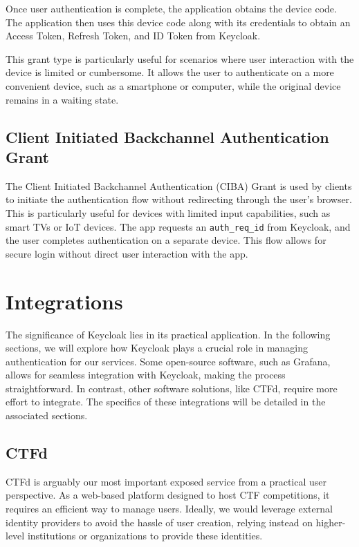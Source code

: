 Once user authentication is complete, the application obtains the device code. The application then uses this device code along with its credentials to obtain an Access Token, Refresh Token, and ID Token from Keycloak.

This grant type is particularly useful for scenarios where user interaction with the device is limited or cumbersome. It allows the user to authenticate on a more convenient device, such as a smartphone or computer, while the original device remains in a waiting state.

\subsection*{Client Initiated Backchannel Authentication Grant}
The Client Initiated Backchannel Authentication (CIBA) Grant is used by clients to initiate the authentication flow without redirecting through the user's browser. This is particularly useful for devices with limited input capabilities, such as smart TVs or IoT devices. The app requests an \texttt{auth\_req\_id} from Keycloak, and the user completes authentication on a separate device. This flow allows for secure login without direct user interaction with the app.

\newpage

\section{Integrations}
The significance of Keycloak lies in its practical application. In the following sections, we will explore how Keycloak plays a crucial role in managing authentication for our services. Some open-source software, such as Grafana, allows for seamless integration with Keycloak, making the process straightforward. In contrast, other software solutions, like CTFd, require more effort to integrate. The specifics of these integrations will be detailed in the associated sections.

\subsection{CTFd}
CTFd is arguably our most important exposed service from a practical user perspective. As a web-based platform designed to host CTF competitions, it requires an efficient way to manage users. Ideally, we would leverage external identity providers to avoid the hassle of user creation, relying instead on higher-level institutions or organizations to provide these identities.


